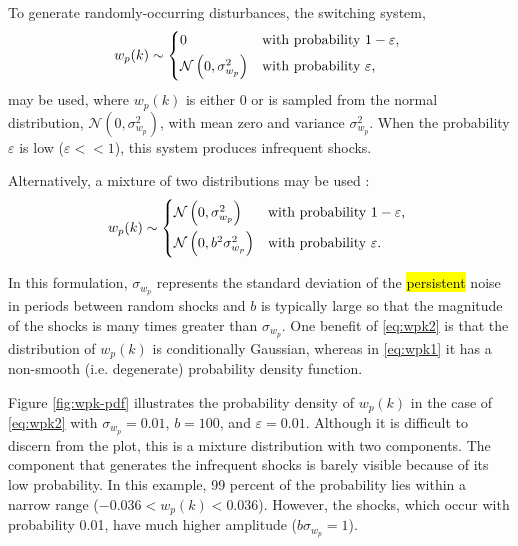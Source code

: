 {To generate randomly-occurring disturbances, the switching system,
\begin{equation} \label{eq:wpk1} 
	w_p(k) \sim 
	\begin{cases*}
		0 & with probability $1-\varepsilon$, \\
		\mathcal{N}\left( 0, \sigma_{w_p}^2 \right) & with probability $\varepsilon$,
	\end{cases*}
\end{equation}
%
may be used, where $w_p(k)$ is either 0 or is sampled from the normal distribution, $\mathcal{N}(0,\sigma_{w_p}^2)$, with mean zero and variance $\sigma_{w_p}^2$.  When the probability $\varepsilon$ is low ($\varepsilon<<1$), this system produces infrequent shocks.
%

Alternatively, a mixture of two distributions may be used \citep{robertson_detection_1995}:
\begin{equation} \label{eq:wpk2}
w_p(k) \sim 
	\begin{cases*}
		\mathcal{N}\left(0, \sigma_{w_p}^2\right) & with probability $1-\varepsilon$, \\
		\mathcal{N}\left(0, b^2\sigma_{w_p}^2\right) & with probability $\varepsilon$.
	\end{cases*}
\end{equation}
%
%

In this formulation, $\sigma_{w_p}$ represents the standard deviation of the \hl{persistent} noise in periods between random shocks and $b$ is typically large so that the magnitude of the shocks is many times greater than $\sigma_{w_p}$. One benefit of \eqref{eq:wpk2} is that the distribution of $w_p(k)$ is conditionally Gaussian, whereas in \eqref{eq:wpk1} it has a non-smooth (i.e. degenerate) probability density function.

Figure \ref{fig:wpk-pdf} illustrates the probability density of $w_p(k)$ in the case of \eqref{eq:wpk2} with $\sigma_{w_p}=0.01$, $b=100$, and $\varepsilon=0.01$. Although it is difficult to discern from the plot, this is a mixture distribution with two components. The component that generates the infrequent shocks is barely visible because of its low probability. In this example, 99 percent of the probability lies within a narrow range ($-0.036 < w_p(k) < 0.036$). However, the shocks, which occur with probability 0.01, have much higher amplitude ($b\sigma_{w_p}=1$).

}
